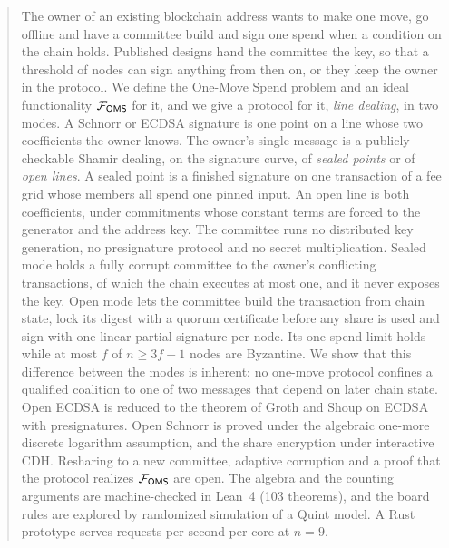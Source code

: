 \begin{abstract}
The owner of an existing blockchain address wants to make one move, go offline and have a committee build and sign one spend when a condition on the chain holds. Published designs hand the committee the key, so that a threshold of nodes can sign anything from then on, or they keep the owner in the protocol. We define the One-Move Spend problem and an ideal functionality $\FOMS$ for it, and we give a protocol for it, \emph{line dealing}, in two modes. A Schnorr or ECDSA signature is one point on a line whose two coefficients the owner knows. The owner's single message is a publicly checkable Shamir dealing, on the signature curve, of \emph{sealed points} or of \emph{open lines}. A sealed point is a finished signature on one transaction of a fee grid whose members all spend one pinned input. An open line is both coefficients, under commitments whose constant terms are forced to the generator and the address key. The committee runs no distributed key generation, no presignature protocol and no secret multiplication. Sealed mode holds a fully corrupt committee to the owner's conflicting transactions, of which the chain executes at most one, and it never exposes the key. Open mode lets the committee build the transaction from chain state, lock its digest with a quorum certificate before any share is used and sign with one linear partial signature per node. Its one-spend limit holds while at most $f$ of $n \ge 3f+1$ nodes are Byzantine. We show that this difference between the modes is inherent: no one-move protocol confines a qualified coalition to one of two messages that depend on later chain state. Open ECDSA is reduced to the theorem of Groth and Shoup on ECDSA with presignatures. Open Schnorr is proved under the algebraic one-more discrete logarithm assumption, and the share encryption under interactive CDH. Resharing to a new committee, adaptive corruption and a proof that the protocol realizes $\FOMS$ are open. The algebra and the counting arguments are machine-checked in Lean~4 (103 theorems), and the board rules are explored by randomized simulation of a Quint model. A Rust prototype serves \nineReqPerCoreLow{} requests per second per core at $n = 9$.
\end{abstract}
